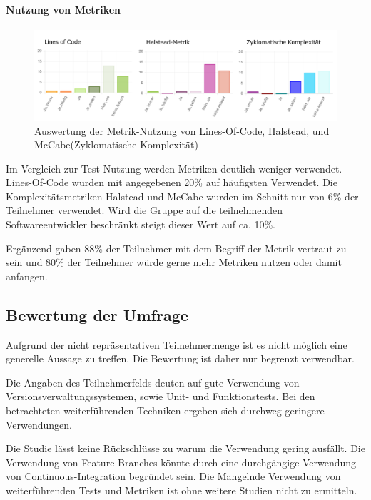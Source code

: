 \paragraph{Nutzung von Metriken}

\begin{figure}[htbp]
  \includegraphics[width=\textwidth, height=\textheight, keepaspectratio]
    {resources/survey-test-usage-metric.pdf}
  \caption{Auswertung der Metrik-Nutzung von Lines-Of-Code, Halstead, und McCabe(Zyklomatische Komplexität)}
\end{figure}

Im Vergleich zur Test-Nutzung werden Metriken deutlich weniger verwendet. Lines-Of-Code wurden mit angegebenen 20\% auf häufigsten Verwendet. Die Komplexitätsmetriken Halstead und McCabe wurden im Schnitt nur von 6\% der Teilnehmer verwendet. Wird die Gruppe auf die teilnehmenden Softwareentwickler beschränkt steigt dieser Wert auf ca. 10\%.

Ergänzend gaben 88\% der Teilnehmer mit dem Begriff der Metrik vertraut zu sein und 80\% der Teilnehmer würde gerne mehr Metriken nutzen oder damit anfangen.

\subsection{Bewertung der Umfrage}

Aufgrund der nicht repräsentativen Teilnehmermenge ist es nicht möglich eine generelle Aussage zu treffen. Die Bewertung ist daher nur begrenzt verwendbar.

Die Angaben des Teilnehmerfelds deuten auf gute Verwendung von Versionsverwaltungssystemen, sowie Unit- und Funktionstests. Bei den betrachteten weiterführenden Techniken ergeben sich durchweg geringere Verwendungen.

Die Studie lässt keine Rückschlüsse zu warum die Verwendung gering ausfällt. Die Verwendung von Feature-Branches könnte durch eine durchgängige Verwendung von Continuous-Integration begründet sein. Die Mangelnde Verwendung von weiterführenden Tests und Metriken ist ohne weitere Studien nicht zu ermitteln.

